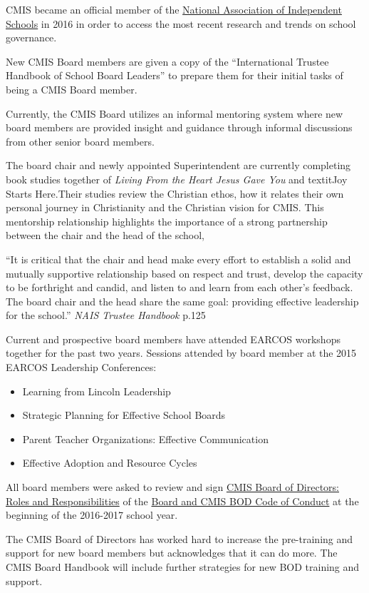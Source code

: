 \begin{findings}
CMIS became an official member of the \href{http://www.nais.org/Articles/Pages/NAIS-Trustee-Handbook-Resources.aspx}{National Association of Independent Schools} in 2016 in order to access the most recent research and trends on school governance. 

New CMIS Board members are given a copy of the “International Trustee Handbook of School Board Leaders” to prepare them for their initial tasks of being a CMIS Board member. 

Currently, the CMIS Board utilizes an informal mentoring system where new board members are provided insight and guidance through informal discussions from other senior board members. 

The board chair and newly appointed Superintendent are currently completing book studies together of \textit{Living From the Heart Jesus Gave You} and textit{Joy Starts Here}.Their studies review the Christian ethos, how it relates their own personal journey in Christianity and the Christian vision for CMIS. This mentorship relationship highlights the importance of a strong partnership between the chair and the head of the school,

``It is critical that the chair and head make every effort to establish a solid and mutually supportive relationship based on respect and trust, develop the capacity to be forthright and candid, and listen to and learn from each other's feedback. The board chair and the head share the same goal: providing effective leadership for the school.'' \textit{NAIS Trustee Handbook} p.125

Current and prospective board members have attended EARCOS workshops together for the past two years. Sessions attended by board member at the 2015 EARCOS Leadership Conferences:
\begin{itemize}
\item Learning from Lincoln Leadership
\item Strategic Planning for Effective School Boards 
\item Parent Teacher Organizations: Effective Communication
\item Effective Adoption and Resource Cycles 
\end{itemize}

All board members were asked to review and sign \href{https://docs.google.com/a/cmis.ac.th/document/d/1sVjFjeVtwbk0-n8GsM5K_XzZSn2wejtlJ3kurXUrKGU/edit?usp=sharing}{CMIS Board of Directors: Roles and Responsibilities} of the \href{https://docs.google.com/a/cmis.ac.th/document/d/1sVjFjeVtwbk0-n8GsM5K_XzZSn2wejtlJ3kurXUrKGU/edit?usp=sharing}{Board and CMIS BOD Code of Conduct} at the beginning of the 2016-2017 school year.


The CMIS Board of Directors has worked hard to increase the pre-training and support for new board members but acknowledges that it can do more. The CMIS Board Handbook will include further strategies for new BOD training and support.
\end{findings}

